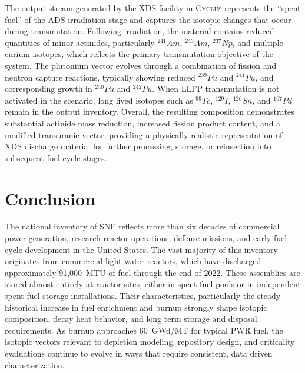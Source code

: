     The output stream generated by the \gls{XDS} facility in \textsc{Cyclus} represents the “spent fuel” of the \gls{ADS} irradiation stage and captures the isotopic changes
    that occur during transmutation. Following irradiation, the material contains reduced quantities of minor actinides, particularly $^{241}Am$, $^{243}Am$, $^{237}Np$,
    and multiple curium isotopes, which reflects the primary transmutation objective of the system.
    The plutonium vector evolves through a combination of fission and neutron capture reactions, typically showing reduced $^{239}Pu$ and $^{241}Pu$, and corresponding growth in $^{240}Pu$ and $^{242}Pu$.
    When LLFP 
    transmutation is not activated in the scenario, long lived isotopes such as $^{99}Tc$, $^{129}I$, $^{126}Sn$, and $^{107}Pd$ remain in the output inventory.
    Overall, the resulting composition demonstrates substantial actinide mass reduction, increased fission product content, and a modified transuranic vector,
    providing a physically realistic representation of \gls{XDS} discharge material for further processing, storage, or reinsertion into subsequent fuel cycle stages\cite{wagner_categorization_2013}.



\section{Conclusion}

    The national inventory of \gls{SNF} reflects more than six decades of commercial power generation,
    research reactor operations, defense missions, and early fuel cycle development in the United States.
    The vast majority of this inventory originates from commercial light water reactors, which have discharged
    approximately 91,000~MTU of fuel through the end of 2022. These assemblies are stored almost entirely at reactor sites,
    either in spent fuel pools or in independent spent fuel storage installations. Their characteristics, particularly the steady
    historical increase in fuel enrichment and burnup strongly shape isotopic composition, decay heat behavior, and long term storage
    and disposal requirements. As burnup approaches 60~GWd/MT for typical \gls{PWR} fuel, the isotopic vectors relevant to depletion
    modeling, repository design, and criticality evaluations continue to evolve in ways that require consistent, data driven
    characterization.\\

